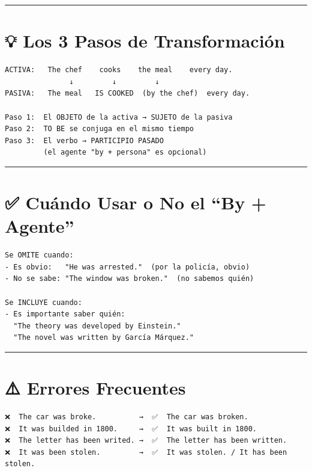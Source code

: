 \documentclass[
  spanish,
  letterpaper,
]{scrbook}
\begin{document}
\begin{center}\rule{0.5\linewidth}{0.5pt}\end{center}

\section{💡 Los 3 Pasos de
Transformación}\label{los-3-pasos-de-transformaciuxf3n}

\begin{verbatim}
ACTIVA:   The chef    cooks    the meal    every day.
               ↓         ↓         ↓
PASIVA:   The meal   IS COOKED  (by the chef)  every day.

Paso 1:  El OBJETO de la activa → SUJETO de la pasiva
Paso 2:  TO BE se conjuga en el mismo tiempo
Paso 3:  El verbo → PARTICIPIO PASADO
         (el agente "by + persona" es opcional)
\end{verbatim}

\begin{center}\rule{0.5\linewidth}{0.5pt}\end{center}

\section{✅ Cuándo Usar o No el ``By +
Agente''}\label{cuuxe1ndo-usar-o-no-el-by-agente}

\begin{verbatim}
Se OMITE cuando:
- Es obvio:   "He was arrested."  (por la policía, obvio)
- No se sabe: "The window was broken."  (no sabemos quién)

Se INCLUYE cuando:
- Es importante saber quién:
  "The theory was developed by Einstein."
  "The novel was written by García Márquez."
\end{verbatim}

\begin{center}\rule{0.5\linewidth}{0.5pt}\end{center}

\section{⚠️ Errores Frecuentes}\label{errores-frecuentes}

\begin{verbatim}
❌  The car was broke.          →  ✅  The car was broken.
❌  It was builded in 1800.     →  ✅  It was built in 1800.
❌  The letter has been writed. →  ✅  The letter has been written.
❌  It was been stolen.         →  ✅  It was stolen. / It has been stolen.
\end{verbatim}
\end{document}
